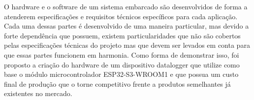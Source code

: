 
O hardware e o software de um sistema embarcado são desenvolvidos de forma a atenderem especificações e requisitos técnicos específicos para cada aplicação. Cada uma dessas partes é desenvolvido de uma maneira particular, mas devido a forte dependência que possuem, existem particularidades que não são cobertos pelas especificações técnicas do projeto mas que devem ser levados em conta para que essas partes funcionem em harmonia. Como forma de demonstrar isso, foi proposto a criação do hardware de um dispositivo datalogger que utilize como base o módulo microcontrolador ESP32-S3-WROOM1 e que possua um custo final de produção que o torne competitivo frente a produtos semelhantes já existentes no mercado.












